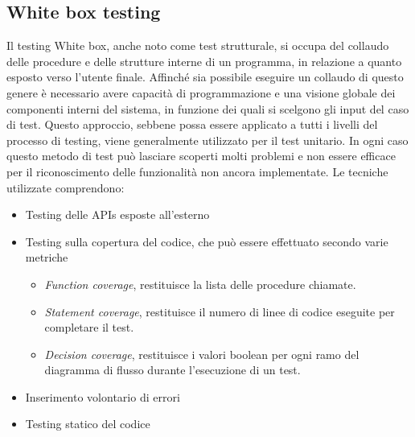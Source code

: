 \subsection{White box testing}
Il testing White box, anche noto come test strutturale, si occupa del collaudo delle procedure e delle strutture interne di un programma, in relazione a quanto esposto verso l'utente finale.
Affinché sia possibile eseguire un collaudo di questo genere è necessario avere capacità di programmazione e una visione globale dei componenti interni del sistema, in funzione dei quali si scelgono gli input del caso di test.
Questo approccio, sebbene possa essere applicato a tutti i livelli del processo di testing, viene generalmente utilizzato per il test unitario.
In ogni caso questo metodo di test può lasciare scoperti molti problemi e non essere efficace per il riconoscimento delle funzionalità non ancora implementate.
Le tecniche utilizzate comprendono:
\begin{itemize}
\item Testing delle APIs esposte all'esterno
\item Testing sulla copertura del codice, che può essere effettuato secondo varie metriche
\begin{itemize}
\item \textit{Function coverage}, restituisce la lista delle procedure chiamate.
\item \textit{Statement coverage}, restituisce il numero di linee di codice eseguite per completare il test.
\item \textit{Decision coverage}, restituisce i valori boolean per ogni ramo del diagramma di flusso durante l'esecuzione di un test.
\end{itemize}
\item Inserimento volontario di errori
\item Testing statico del codice
\end{itemize}
